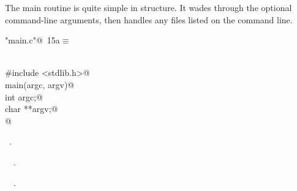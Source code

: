 \documentclass[a4paper]{report}
\begin{document}
The main routine is quite simple in structure.
It wades through the optional command-line arguments,
then handles any files listed on the command line.
\begin{flushleft} \small
\begin{minipage}{\linewidth}\label{scrap15}\raggedright\small
{} \verb@"main.c"@\nobreak\ {\footnotesize {15a}}$\equiv$
\vspace{-1ex}
\begin{list}{}{} \item
\mbox{}\verb@@\\
\mbox{}\verb@#include <stdlib.h>@\\
\mbox{}\verb@int main(argc, argv)@\\
\mbox{}\verb@     int argc;@\\
\mbox{}\verb@     char **argv;@\\
\mbox{}@\\
\mbox{}\verb@@{\NWsep}
\end{list}
\vspace{-1.5ex}
\footnotesize
\begin{list}{}{\setlength{\itemsep}{-\parsep}\setlength{\itemindent}{-\leftmargin}}
\item \NWtxtFileDefBy\ .
\item \NWtxtIdentsDefed\nobreak\  \verb@main@\nobreak\ \NWtxtIdentsNotUsed.\item \NWtxtIdentsUsed\nobreak\  \verb@exit@\nobreak\ .
\item{}
\end{list}
\end{minipage}\vspace{4ex}
\end{flushleft}
\end{document}
